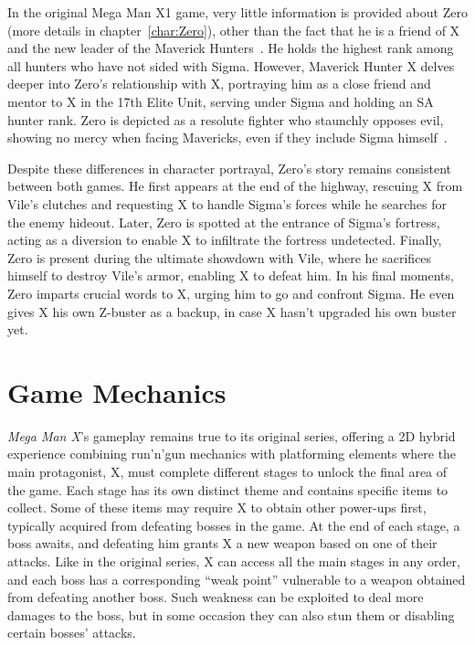 In the original Mega Man X1 game, very little information is provided about Zero (more details in chapter~\ref{char:Zero}), other than the fact that he is a friend of X and the new leader of the Maverick Hunters~\cite{X:Manual}. He holds the highest rank among all hunters who have not sided with Sigma. However, Maverick Hunter X delves deeper into Zero's relationship with X, portraying him as a close friend and mentor to X in the 17th Elite Unit, serving under Sigma and holding an SA hunter rank. Zero is depicted as a resolute fighter who staunchly opposes evil, showing no mercy when facing Mavericks, even if they include Sigma himself~\cite{Xcoll1:Manual_X1}.

Despite these differences in character portrayal, Zero's story remains consistent between both games. He first appears at the end of the highway, rescuing X from Vile's clutches and requesting X to handle Sigma's forces while he searches for the enemy hideout. Later, Zero is spotted at the entrance of Sigma's fortress, acting as a diversion to enable X to infiltrate the fortress undetected. Finally, Zero is present during the ultimate showdown with Vile, where he sacrifices himself to destroy Vile's armor, enabling X to defeat him. In his final moments, Zero imparts crucial words to X, urging him to go and confront Sigma. He even gives X his own Z-buster as a backup, in case X hasn't upgraded his own buster yet.

\section{Game Mechanics}
\textit{Mega Man X}'s gameplay remains true to its original series, offering a 2D hybrid experience combining run'n'gun mechanics with platforming elements where the main protagonist, X, must complete different stages to unlock the final area of the game. Each stage has its own distinct theme and contains specific items to collect. Some of these items may require X to obtain other power-ups first, typically acquired from defeating bosses in the game. At the end of each stage, a boss awaits, and defeating him grants X a new weapon based on one of their attacks. Like in the original series, X can access all the main stages in any order, and each boss has a corresponding ``weak point'' vulnerable to a weapon obtained from defeating another boss. Such weakness can be exploited to deal more damages to the boss, but in some occasion they can also stun them or disabling certain bosses' attacks.

